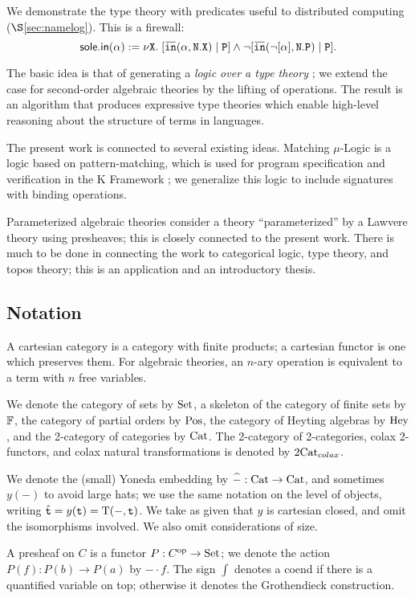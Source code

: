 \documentclass[stthol.tex]{subfiles}
\begin{document}
We demonstrate the type theory with predicates useful to distributed computing ($\S$\ref{sec:namelog}). This is a firewall:
$$\msf{sole.in}(\alpha) := \nu\X.\; [\ob{\tti}(\alpha,\N.\X)\ttp\PP] \land \neg[\ob{\tti}(\neg[\alpha],\N.\PP)\ttp \PP].$$

The basic idea is that of generating a \textit{logic over a type theory} \cite{jacobs}; we extend the case for second-order algebraic theories by the lifting of operations. The result is an algorithm that produces expressive type theories which enable high-level reasoning about the structure of terms in languages.

The present work is connected to several existing ideas. Matching $\mu$-Logic \cite{matchlog} is a logic based on pattern-matching, which is used for program specification and verification in the K Framework \cite{kframe}; we generalize this logic to include signatures with binding operations.

Parameterized algebraic theories \cite{param} consider a theory ``parameterized'' by a Lawvere theory using presheaves; this is closely connected to the present work. There is much to be done in connecting the work to categorical logic, type theory, and topos theory; this is an application and an introductory thesis.

\subsection{Notation}
\label{ssec:notate}

A cartesian category is a category with finite products; a cartesian functor is one which preserves them. For algebraic theories, an $n$-ary operation is equivalent to a term with $n$ free variables.

We denote the category of sets by $\mathrm{Set}$, a skeleton of the category of finite sets by $\mathbb{F}$, the category of partial orders by $\mathrm{Pos}$, the category of Heyting algebras by $\mathrm{Hey}$, and the 2-category of categories by $\mathrm{Cat}$. The 2-category of 2-categories, colax 2-functors, and colax natural transformations is denoted by $\mathrm{2Cat}_{colax}$.

We denote the (small) Yoneda embedding by $\widehat{-}:\mathrm{Cat}\to \mathrm{Cat}$, and sometimes $y(-)$ to avoid large hats; we use the same notation on the level of objects, writing $\hat{\mathtt{t}}=y(\mathtt{t})=\mathrm{T}(-,\mathtt{t})$. We take as given that $y$ is cartesian closed, and omit the isomorphisms involved. We also omit considerations of size.

A presheaf on $C$ is a functor $P:C^{\mathrm{op}}\to \mathrm{Set}$; we denote the action $P(f):P(b)\to P(a)$ by $-\cdot f$. The sign $\int$ denotes a coend if there is a quantified variable on top; otherwise it denotes the Grothendieck construction.
\end{document}
